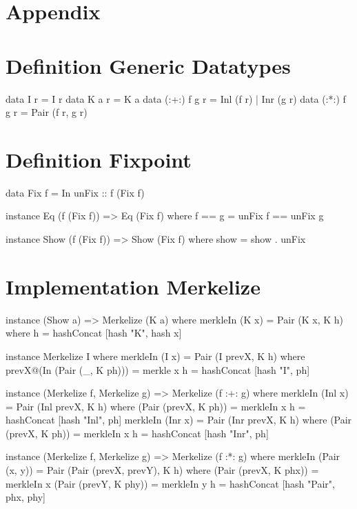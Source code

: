 \section{Appendix}
\appendix

\section{Definition Generic Datatypes}
\label{app-def-generic-datatypes}
\begin{haskell}
data I r         = I r                  
data K a r       = K a                  
data (:+:) f g r = Inl (f r) | Inr (g r)
data (:*:) f g r = Pair (f r, g r)      
\end{haskell}

\section{Definition Fixpoint}
\label{app-def-fixpoint}
\begin{haskell}
data Fix f = In { unFix :: f (Fix f) }

instance Eq (f (Fix f)) => Eq (Fix f) where
    f == g = unFix f == unFix g

instance Show (f (Fix f)) => Show (Fix f) where
    show = show . unFix
\end{haskell}

\section{Implementation Merkelize}
\label{app-impl-merkelize}
\begin{haskell}
instance (Show a) => Merkelize (K a) where
  merkleIn (K x) = Pair (K x, K h)
    where
      h = hashConcat [hash "K", hash x]

instance Merkelize I where
  merkleIn (I x) = Pair (I prevX, K h)
    where
      prevX@(In (Pair (_, K ph))) = merkle x
      h = hashConcat [hash "I", ph]

instance (Merkelize f, Merkelize g) => Merkelize (f :+: g) where
  merkleIn (Inl x) = Pair (Inl prevX, K h)
    where
      (Pair (prevX, K ph)) = merkleIn x
      h = hashConcat [hash "Inl", ph]
  merkleIn (Inr x) = Pair (Inr prevX, K h)
    where
      (Pair (prevX, K ph)) = merkleIn x
      h = hashConcat [hash "Inr", ph]

instance (Merkelize f, Merkelize g) => Merkelize (f :*: g) where
  merkleIn (Pair (x, y)) = Pair (Pair (prevX, prevY), K h)
    where
      (Pair (prevX, K phx)) = merkleIn x
      (Pair (prevY, K phy)) = merkleIn y
      h = hashConcat [hash "Pair", phx, phy]
\end{haskell}
